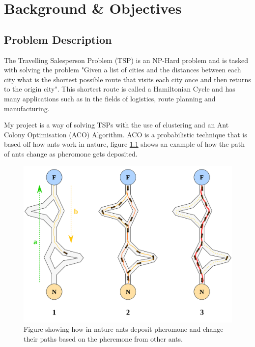 \chapter{Background \& Objectives}

\section{Problem Description}

The Travelling Salesperson Problem (TSP) is an NP-Hard problem\cite{BASSETTO2011253} and is tasked with solving the problem "Given a list of cities and the distances between each city what is the shortest possible route that visits each city once and then returns to the origin city". This shortest route is called a Hamiltonian Cycle and has many applications such as in the fields of logistics, route planning and manufacturing. 

My project is a way of solving TSPs with the use of clustering and an Ant Colony Optimisation (ACO) Algorithm. ACO is a probabilistic technique that is based off how ants work in nature, figure \ref{fig:aco_pheremone_example} shows an example of how the path of ants change as pheromone gets deposited.

\begin{figure}
    \centering
    \includegraphics[width=\textwidth]{Project Report/LaTeX Template/figures/aco_pheremone_demo.png}
    \caption{Figure showing how in nature ants deposit pheromone and change their paths based on the pheremone from other ants.}
    \label{fig:aco_pheremone_example}
\end{figure}

